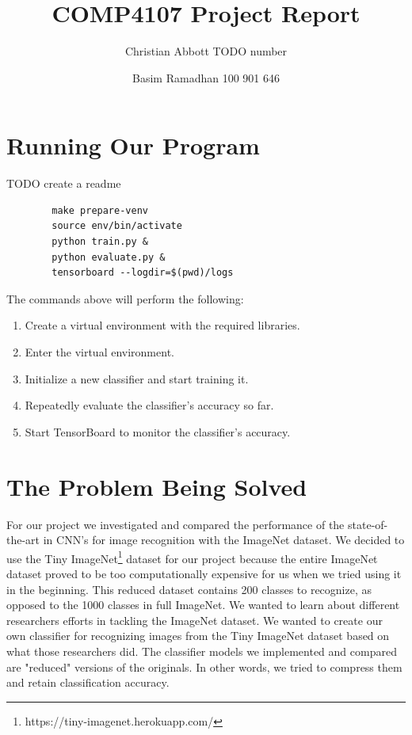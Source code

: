 \documentclass[10pt]{article} %
\title{COMP4107 Project Report}
\author{Christian Abbott TODO number}
\date{Basim Ramadhan 100 901 646} %
\begin{document}
	\maketitle
	
	\section{Running Our Program}
	
	TODO create a readme
	
	
	
	\begin{tcolorbox}
		\begin{verbatim}
		make prepare-venv
		source env/bin/activate
		python train.py & 
		python evaluate.py &
		tensorboard --logdir=$(pwd)/logs
		\end{verbatim}
	\end{tcolorbox}
	
	The commands above will perform the following:
	
	\begin{enumerate}
		\item Create a virtual environment with the required libraries.
		\item Enter the virtual environment.
		\item Initialize a new classifier and start training it.
		\item Repeatedly evaluate the classifier's accuracy so far.
		\item Start TensorBoard to monitor the classifier's accuracy.
	\end{enumerate}
	
	\section{The Problem Being Solved}
	
	For our project we investigated and compared the performance of the state-of-the-art in CNN's for image recognition with the ImageNet dataset. We decided to use the Tiny ImageNet\footnote{https://tiny-imagenet.herokuapp.com/} dataset for our project because the entire ImageNet dataset proved to be too computationally expensive for us when we tried using it in the beginning. This reduced dataset contains 200 classes to recognize, as opposed to the 1000 classes in full ImageNet. We wanted to learn about different researchers efforts in tackling the ImageNet dataset. We wanted to create our own classifier for recognizing images from the Tiny ImageNet dataset based on what those researchers did. The classifier models we implemented and compared are "reduced" versions of the originals. In other words, we tried to compress them and retain classification accuracy.
	
\end{document}
